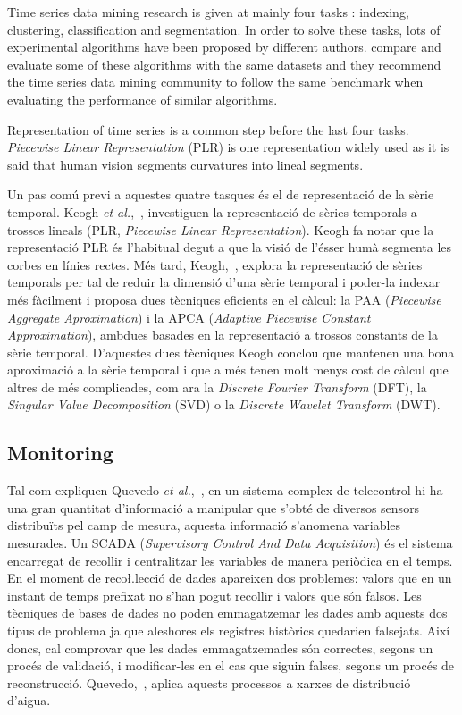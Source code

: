 Time series data mining research  is given at mainly four tasks \parencite{keogh02}: indexing, clustering, classification and segmentation. In order to solve these tasks, lots of experimental algorithms have been proposed by different authors. \textcite{keogh02} compare and evaluate some of these algorithms with the same datasets and they recommend the time series data mining community to follow the same benchmark when evaluating the performance of similar algorithms. 

Representation of time series is a common step before the last four tasks. 
\emph{Piecewise Linear Representation} (PLR) \parencite{keogh97,keogh98}  is one representation widely used as it is said that human vision segments curvatures into lineal segments.




Un pas comú previ a aquestes quatre tasques és el de representació de la sèrie temporal. 
Keogh \emph{et al.},~\cite{keogh97,keogh98}, investiguen la representació de sèries temporals a trossos lineals (PLR, \emph{Piecewise Linear Representation}). Keogh fa notar que la representació PLR és l'habitual degut a que la visió de l'ésser humà segmenta les corbes en línies rectes.
Més tard, Keogh,~\cite{keogh00,keogh01}, explora la representació de sèries temporals per tal de reduir la dimensió d'una sèrie temporal i poder-la indexar més fàcilment  i proposa dues tècniques eficients en el càlcul: la PAA (\emph{Piecewise Aggregate Aproximation}) i  la APCA (\emph{Adaptive Piecewise Constant Approximation}), ambdues basades en la representació a trossos constants de la sèrie temporal. 
D'aquestes dues tècniques Keogh conclou que mantenen una bona aproximació a la sèrie temporal i que a més  tenen molt menys cost de càlcul que altres de més complicades, com ara la \emph{Discrete Fourier Transform} (DFT),  la  \emph{Singular Value Decomposition} (SVD) o la \emph{Discrete Wavelet Transform} (DWT).



\subsection{Monitoring}
Tal com expliquen Quevedo \emph{et al.},~\cite{quevedo10}, en un sistema complex de telecontrol hi ha una gran quantitat d'informació a manipular que s'obté de diversos sensors distribuïts pel camp de mesura, aquesta informació s'anomena variables mesurades. Un SCADA (\emph{Supervisory Control And Data Acquisition})  és el sistema encarregat de recollir i centralitzar les variables de manera periòdica en el temps. En el moment de reco\l.lecció de dades apareixen dos problemes: valors que en un instant de temps prefixat no s'han pogut recollir i valors que són falsos. Les tècniques de bases de dades no poden emmagatzemar les dades amb aquests dos tipus de problema ja que aleshores els registres històrics quedarien falsejats. Així doncs, cal comprovar que les dades emmagatzemades són correctes, segons un procés de validació, i modificar-les en el cas que siguin falses, segons un procés de reconstrucció. Quevedo,~\cite{quevedo10}, aplica aquests processos a xarxes de distribució d'aigua.

